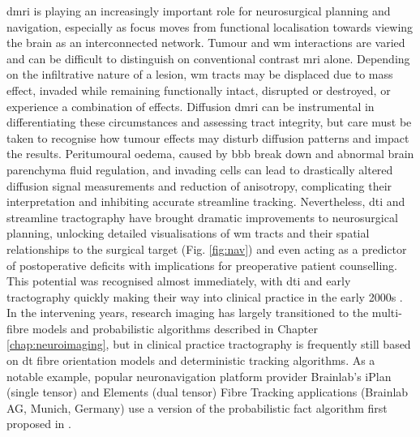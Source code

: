 \Gls{dmri} is playing an increasingly important role for neurosurgical planning and navigation\autocite{Manan2022}, especially as focus moves from functional localisation towards viewing the brain as an interconnected network.
Tumour and \gls{wm} interactions are varied and can be difficult to distinguish on conventional contrast \gls{mri} alone.
Depending on the infiltrative nature of a lesion, \gls{wm} tracts may be displaced due to mass effect, invaded while remaining functionally intact, disrupted or destroyed, or experience a combination of effects\autocite{Essayed2017,DSouza2019,Manan2023}.
Diffusion \gls{dmri} can be instrumental in differentiating these circumstances and assessing tract integrity\autocite{Field2004,Manan2023}, but care must be taken to recognise how tumour effects may disturb diffusion patterns and impact the results.
Peritumoural oedema, caused by \gls{bbb} break down and abnormal brain parenchyma fluid regulation\autocite{Ohmura2023}, and invading cells can lead to drastically altered diffusion signal measurements and reduction of anisotropy, complicating their interpretation and inhibiting accurate streamline tracking\autocite{Bulakbas2009,Nimsky2010,Kuhnt2013}.
Nevertheless, \gls{dti} and streamline tractography have brought dramatic improvements to neurosurgical planning, unlocking detailed visualisations of \gls{wm} tracts and their spatial relationships to the surgical target (Fig. \ref{fig:nav}) and even acting as a predictor of postoperative deficits with implications for preoperative patient counselling\autocite{Manan2022}.
This potential was recognised almost immediately, with \gls{dti} and early tractography quickly making their way into clinical practice in the early 2000s \autocite{Lee2001,Mori2002a,Nimsky2005}.
In the intervening years, research imaging has largely transitioned to the multi-fibre models and probabilistic algorithms described in Chapter \ref{chap:neuroimaging}, but in clinical practice tractography is frequently still based on \gls{dt} fibre orientation models \autocite{Toescu2020, Yang2021} and deterministic tracking algorithms.
As a notable example, popular neuronavigation platform provider Brainlab's iPlan\textregistered{} (single tensor)\autocite{Brainlab2012} and Elements (dual tensor)\autocite{Sollmann2020a} Fibre Tracking applications (Brainlab AG, Munich, Germany) use a version of the probabilistic \gls{fact} algorithm first proposed in \citeyear{Mori1999} \autocite{Mori1999}.

